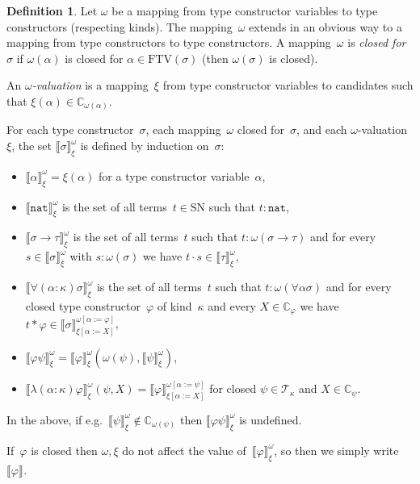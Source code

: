 \documentclass[a4paper,UKenglish,cleveref,autoref,numberwithinsect]{lipics-v2019}
\theoremstyle{definition}
\newtheorem{defn}[theorem]{Definition}
\newcommand{\arrtype}{\rightarrow}
\newcommand{\app}[2]{#1 \cdot #2}
\newcommand{\tapp}[2]{#1 * #2}
\newcommand{\subst}[2]{#1:=#2}
\newcommand{\nat}{\mathtt{nat}}
\newcommand{\FTV}{\mathrm{FTV}}
\newcommand{\Tc}{\mathcal{T}}
\newcommand{\SN}{\mathrm{SN}}
\newcommand{\Cb}{\mathbb{C}}
\newcommand{\val}[3]{\ensuremath{\llbracket#1\rrbracket_{#2}^{#3}}}
\begin{document}
\begin{defn}\label{def_computability_valuation}
  Let $\omega$ be a mapping from type constructor variables to type
  constructors (respecting kinds). The mapping~$\omega$ extends in an
  obvious way to a mapping from type constructors to type
  constructors. A mapping~$\omega$ is \emph{closed for~$\sigma$} if
  $\omega(\alpha)$ is closed for $\alpha \in \FTV(\sigma)$ (then
  $\omega(\sigma)$ is closed).

  An \emph{$\omega$-valuation} is a mapping~$\xi$ from type
  constructor variables to candidates such that $\xi(\alpha) \in
  \Cb_{\omega(\alpha)}$.

  For each type constructor~$\sigma$, each mapping~$\omega$ closed
  for~$\sigma$, and each $\omega$-valuation~$\xi$, the set
  $\val{\sigma}{\xi}{\omega}$ is defined by induction on~$\sigma$:
  \begin{itemize}
  \item $\val{\alpha}{\xi}{\omega} = \xi(\alpha)$ for a type
    constructor variable~$\alpha$,
  \item $\val{\nat}{\xi}{\omega}$ is the set of all terms~$t \in \SN$
    such that $t : \nat$,
  \item $\val{\sigma \arrtype \tau}{\xi}{\omega}$ is the set of all
    terms~$t$ such that $t : \omega(\sigma\arrtype\tau)$ and for
    every~$s \in \val{\sigma}{\xi}{\omega}$ with $s : \omega(\sigma)$
    we have $\app{t}{s} \in \val{\tau}{\xi}{\omega}$,
  \item $\val{\forall(\alpha:\kappa)\sigma}{\xi}{\omega}$ is the set
    of all terms~$t$ such that $t : \omega(\forall\alpha\sigma)$ and
    for every closed type constructor~$\varphi$ of kind~$\kappa$ and
    every $X \in \Cb_\varphi$ we have $\tapp{t}{\varphi} \in
    \val{\sigma}{\xi[\subst{\alpha}{X}]}{\omega[\subst{\alpha}{\varphi}]}$,
  \item
    $\val{\varphi \psi}{\xi}{\omega} =
    \val{\varphi}{\xi}{\omega}(\omega(\psi),\val{\psi}{\xi}{\omega})$,
  \item
    $\val{\lambda(\alpha:\kappa)\varphi}{\xi}{\omega}(\psi,X) =
    \val{\varphi}{\xi[\subst{\alpha}{X}]}{\omega[\subst{\alpha}{\psi}]}$
    for closed $\psi \in \Tc_\kappa$ and $X \in \Cb_\psi$.
  \end{itemize}
  In the above, if e.g.~$\val{\psi}{\xi}{\omega} \notin
  \Cb_{\omega(\psi)}$ then $\val{\varphi \psi}{\xi}{\omega}$ is
  undefined.
\end{defn}

If~$\varphi$ is closed then $\omega,\xi$ do not affect the value
of~$\val{\varphi}{\xi}{\omega}$, so then we simply
write~$\val{\varphi}{}{}$.
\end{document}
